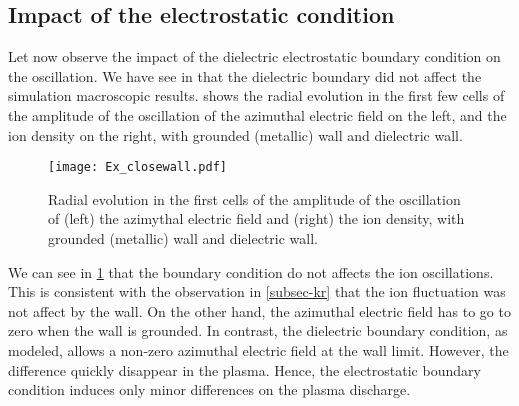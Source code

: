   \subsection{Impact of the electrostatic condition}
  \label{subsec-BC}
  
  Let now observe the impact of the dielectric electrostatic boundary condition on the oscillation.
  We have see in  that the dielectric boundary did not affect the simulation macroscopic results.
   shows the radial evolution in the first few cells of the amplitude of the oscillation of the azimuthal electric field on the left, and the ion density on the right, with grounded (metallic) wall and dielectric wall.
  
  \begin{figure}[hbtp]
    \centering
    \texttt{[image: Ex\_closewall.pdf]}
    \caption{Radial evolution in the first cells of the amplitude of the oscillation of (left) the azimythal electric field and (right) the ion density, with grounded (metallic) wall and dielectric wall.}
    \label{fig-closswallosci}
  \end{figure}
  
  We can see in \cref{fig-closswallosci} that the boundary condition do not affects the ion oscillations.
  This is consistent with the observation in \cref{subsec-kr} that the ion fluctuation was not affect by the wall.
  On the other hand, the azimuthal electric field has to go to zero when the wall is grounded.
  In contrast, the dielectric boundary condition, as modeled, allows a non-zero azimuthal electric field at the wall limit.
  However, the difference quickly disappear in the plasma.
  Hence, the electrostatic boundary condition induces only minor differences on the plasma discharge.
  
  